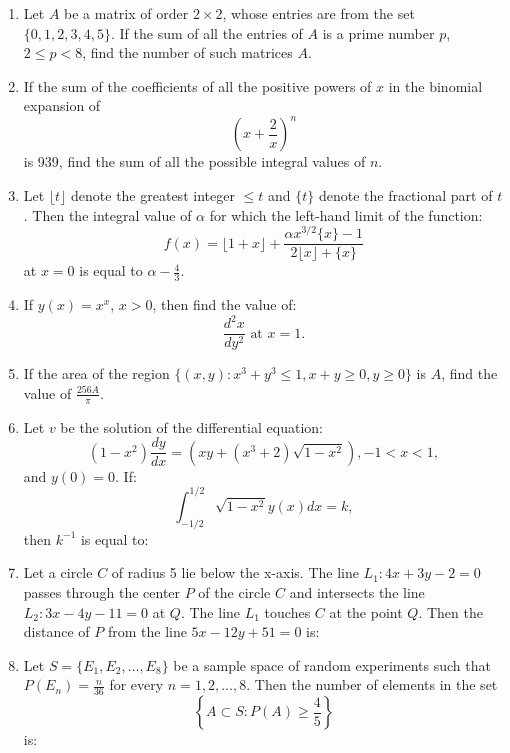 \documentclass[journal,12pt,twocolumn]{IEEEtran}
\theoremstyle{remark}
\begin{document}
\begin{enumerate}
    \item Let $ A $ be a matrix of order $ 2 \times 2 $, whose entries are from the set $ \{0, 1, 2, 3, 4, 5\} $. If the sum of all the entries of $ A $ is a prime number $ p $, $ 2 \leq p < 8 $, find the number of such matrices $ A $.

    \item If the sum of the coefficients of all the positive powers of $ x $ in the binomial expansion of 
    \[
    \left( x + \frac{2}{x} \right)^n
    \]
    is 939, find the sum of all the possible integral values of $ n $.


    \item Let $ \lfloor t \rfloor $ denote the greatest integer $ \leq t $ and $ \{ t \} $ denote the fractional part of $ t $. Then the integral value of $ \alpha $ for which the left-hand limit of the function:
    \[
    f(x) = \lfloor 1 + x \rfloor + \frac{\alpha x^{3/2} \{ x \} - 1}{2 \lfloor x \rfloor + \{ x \}}
    \]
    at $ x = 0 $ is equal to $ \alpha - \frac{4}{3} $.

    \item If $ y(x) = x^x $, $ x > 0 $, then find the value of:
    \[
    \frac{d^2x}{dy^2} \text{ at } x = 1.
    \]

    \item If the area of the region $ \{ (x, y): x^3 + y^3 \leq 1, x + y \geq 0, y \geq 0 \} $ is $ A $, find the value of $ \frac{256A}{\pi} $.

    \item Let $ v $ be the solution of the differential equation:
    \[
    (1 - x^2) \frac{dy}{dx} = (xy + (x^3 + 2)\sqrt{1 - x^2}), -1 < x < 1,
    \]
    and $ y(0) = 0 $. If:
    \[
    \int_{-1/2}^{1/2} \sqrt{1 - x^2} y(x) dx = k,
    \]
    then $ k^{-1} $ is equal to:

    \item Let a circle $ C $ of radius 5 lie below the x-axis. The line $ L_1: 4x + 3y - 2 = 0 $ passes through the center $ P $ of the circle $ C $ and intersects the line $ L_2: 3x - 4y - 11 = 0 $ at $ Q $. The line $ L_1 $ touches $ C $ at the point $ Q $. Then the distance of $ P $ from the line $ 5x - 12y + 51 = 0 $ is:
    
    \item Let $ S = \{ E_1, E_2, \dots, E_8 \} $ be a sample space of random experiments such that $ P(E_n) = \frac{n}{36} $ for every $ n = 1, 2, \dots, 8 $. Then the number of elements in the set 
    \[
    \left\{ A \subset S : P(A) \geq \frac{4}{5} \right\}
    \]
    is:
   

    
\end{enumerate}
\end{document}
